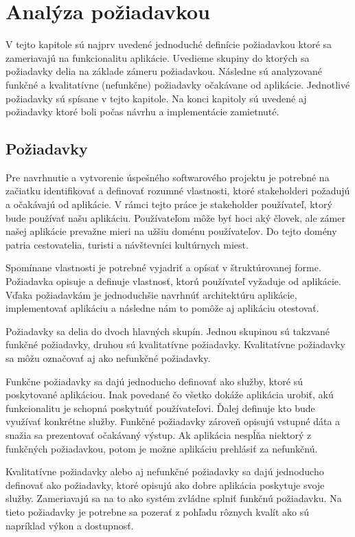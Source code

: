 
\chapter{Analýza požiadavkou}

V tejto kapitole sú najprv uvedené jednoduché definície požiadavkou ktoré sa
zameriavajú na funkcionalitu aplikácie. Uvedieme skupiny do ktorých sa požiadavky delia na základe zámeru požiadavkou.
Následne sú analyzované funkčné a kvalitatívne (nefunkčne) požiadavky očakávane od aplikácie.
Jednotlivé požiadavky sú spísane v tejto kapitole.
Na konci kapitoly sú uvedené aj požiadavky ktoré boli počas návrhu a implementácie zamietnuté.

\section{Požiadavky}
Pre navrhnutie a vytvorenie úspešného softwarového projektu je potrebné na začiatku identifikovať a
definovať rozumné vlastnosti, ktoré stakeholderi požadujú a očakávajú od aplikácie. V rámci tejto práce je stakeholder
používateľ, ktorý bude používať našu aplikáciu. Používateľom môže byť hoci aký človek, ale zámer našej aplikácie prevažne
mieri na užšiu doménu používateľov. Do tejto domény patria cestovatelia, turisti a návštevníci kultúrnych miest.

Spomínane vlastnosti je potrebné vyjadriť a opísať v štruktúrovanej forme.
Požiadavka opisuje a definuje vlastnosť, ktorú používateľ vyžaduje od aplikácie.
Vďaka požiadavkám je jednoduchšie navrhnúť architektúru aplikácie, implementovať aplikáciu a následne
nám to pomôže aj aplikáciu otestovať.

Požiadavky sa delia do dvoch hlavných skupín. Jednou skupinou sú takzvané funkčné požiadavky, druhou
sú kvalitatívne požiadavky. Kvalitatívne požiadavky sa môžu označovať aj ako nefunkčné požiadavky.

Funkčne požiadavky sa dajú jednoducho definovať ako služby, ktoré sú poskytované aplikáciou. Inak povedané čo všetko
dokáže aplikácia urobiť, akú funkcionalitu je schopná poskytnúť používateľovi. Ďalej definuje kto bude využívať konkrétne služby.
Funkčné požiadavky zároveň
opisujú vstupné dáta a snažia sa prezentovať očakávaný výstup. Ak aplikácia nespĺňa niektorý z
funkčných požiadavkou, potom je možne aplikáciu prehlásiť za nefunkčnú.

Kvalitatívne požiadavky alebo aj nefunkčné požiadavky sa dajú jednoducho definovať ako požiadavky,
ktoré opisujú ako dobre aplikácia poskytuje svoje služby. Zameriavajú sa na to ako systém zvládne
splniť funkčnú požiadavku. Na tieto požiadavky je potrebne sa pozerať z pohľadu rôznych kvalít ako sú
napríklad výkon a dostupnosť.


